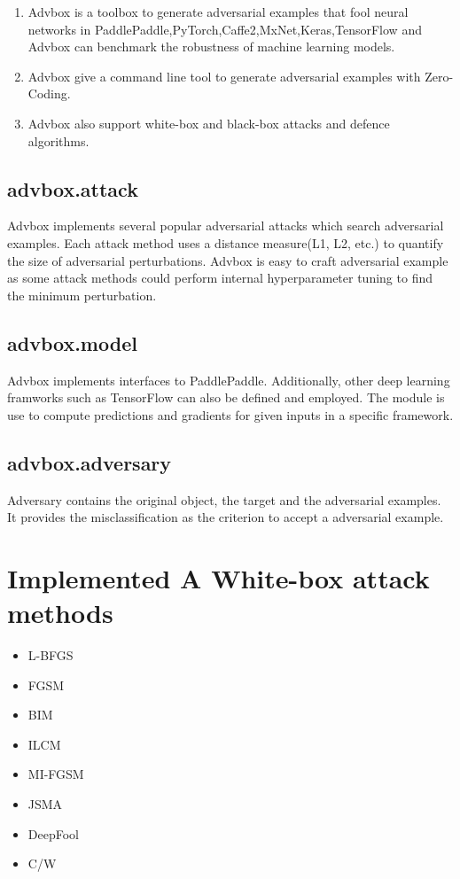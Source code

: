 \documentclass{article}
\begin{document}
\begin{enumerate}
    \item Advbox is a toolbox to generate adversarial examples that fool neural networks in PaddlePaddle,PyTorch,Caffe2,MxNet,Keras,TensorFlow and Advbox can benchmark the robustness of machine learning models. 
    \item Advbox give a command line tool to generate adversarial examples with Zero-Coding. 
    \item Advbox also support white-box and black-box attacks and defence algorithms.
\end{enumerate}

\subsection{advbox.attack}
Advbox implements several popular adversarial attacks which search adversarial examples. Each attack method uses a distance measure(L1, L2, etc.) to quantify the size of adversarial perturbations. Advbox is easy to craft adversarial example as some attack methods could perform internal hyperparameter tuning to find the minimum perturbation.

\subsection{advbox.model}
Advbox implements interfaces to PaddlePaddle. Additionally, other deep learning framworks such as TensorFlow can also be defined and employed. The module is use to compute predictions and gradients for given inputs in a specific framework.

\subsection{advbox.adversary}
Adversary contains the original object, the target and the adversarial examples. It provides the misclassification as the criterion to accept a adversarial example.

\section{Implemented A White-box attack methods}

\begin{itemize}
\item L-BFGS
\item FGSM
\item BIM
\item ILCM
\item MI-FGSM
\item JSMA
\item DeepFool
\item C/W
\end{itemize}
\end{document}
